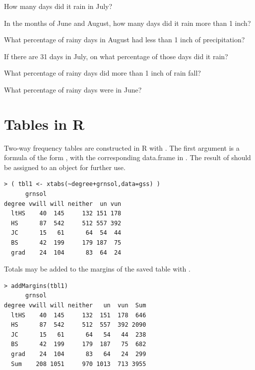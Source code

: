 \documentclass[10pt,openany]{book}\usepackage[]{graphicx}\usepackage[]{color}
\makeatletter
\newenvironment{kframe}{%
 \def\at@end@of@kframe{}%
 \ifinner\ifhmode%
  \def\at@end@of@kframe{\end{minipage}}%
  \begin{minipage}{\columnwidth}%
 \fi\fi%
 \def\FrameCommand##1{\hskip\@totalleftmargin \hskip-\fboxsep
 \colorbox{shadecolor}{##1}\hskip-\fboxsep
     \hskip-\linewidth \hskip-\@totalleftmargin \hskip\columnwidth}%
 \MakeFramed {\advance\hsize-\width
   \@totalleftmargin\z@ \linewidth\hsize
   \@setminipage}}%
 {\par\unskip\endMakeFramed%
 \at@end@of@kframe}
\newenvironment{knitrout}{}{} %
\makeatother
\begin{document}
\begin{exsection}
  \begin{Enumerate}
    \item How many days did it rain in July?
    \item In the months of June and August, how many days did it rain more than 1 inch?
    \item What percentage of rainy days in August had less than 1 inch of precipitation?
    \item If there are 31 days in July, on what percentage of those days did it rain?
    \item What percentage of rainy days did more than 1 inch of rain fall?
    \item What percentage of rainy days were in June?
  \end{Enumerate}
\end{exsection}

\section{Tables in R}  \label{sect:Tables2}
Two-way frequency tables are constructed in R with .  The first argument is a formula of the form , with the corresponding data.frame in .  The result of  should be assigned to an object for further use.
\begin{knitrout}
\color{fgcolor}\begin{kframe}
\begin{verbatim}
> ( tbl1 <- xtabs(~degree+grnsol,data=gss) )
      grnsol
degree vwill will neither  un vun
  ltHS    40  145     132 151 178
  HS      87  542     512 557 392
  JC      15   61      64  54  44
  BS      42  199     179 187  75
  grad    24  104      83  64  24
\end{verbatim}
\end{kframe}
\end{knitrout}
Totals may be added to the margins of the saved table with .
\begin{knitrout}
\color{fgcolor}\begin{kframe}
\begin{verbatim}
> addMargins(tbl1)
      grnsol
degree vwill will neither   un  vun  Sum
  ltHS    40  145     132  151  178  646
  HS      87  542     512  557  392 2090
  JC      15   61      64   54   44  238
  BS      42  199     179  187   75  682
  grad    24  104      83   64   24  299
  Sum    208 1051     970 1013  713 3955
\end{verbatim}
\end{kframe}
\end{knitrout}
\end{document}

